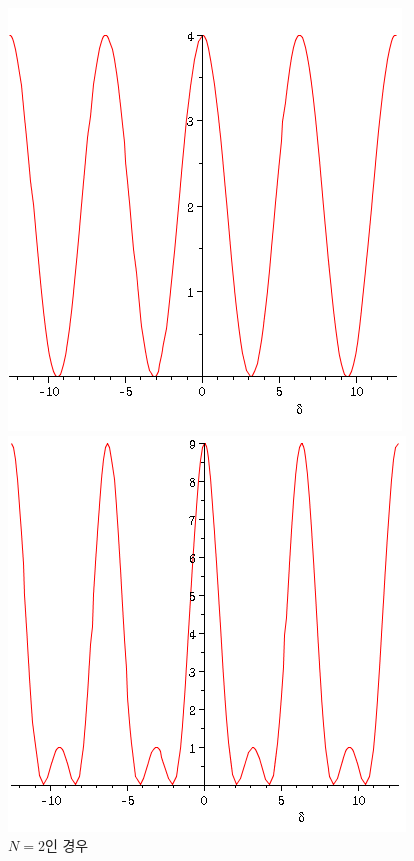 \begin{figure}[!htb]
  \includegraphics[width=\linewidth]{Pictures/n=2.PNG}
  \caption{$N=2$인 경우 }\label{fig:awesome_image1}
\endminipage\hfill
{}
  \includegraphics[width=\linewidth]{Pictures/n=3.PNG}

\end{figure}
